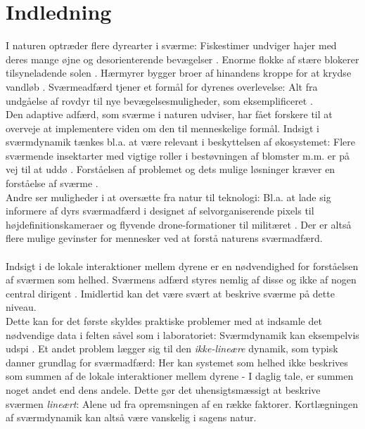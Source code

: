 \chapter{Indledning}\label{ch:introduction}

I naturen optræder flere dyrearter i sværme: Fiskestimer undviger hajer med deres mange øjne og desorienterende bevægelser \cite{fishschooling}. Enorme flokke af stære blokerer tilsyneladende solen \cite{sortsol}. Hærmyrer bygger broer af hinandens kroppe for at krydse vandløb \cite{armyants}. 
Sværmeadfærd tjener et formål for dyrenes overlevelse: Alt fra undgåelse af rovdyr til nye bevægelsesmuligheder, som eksemplificeret \cite{biofoundations}.\\
Den adaptive adfærd, som sværme i naturen udviser, har fået forskere til at overveje at implementere viden om den til menneskelige formål.
Indsigt i sværmdynamik tænkes bl.a. at være relevant i beskyttelsen af økosystemet: Flere sværmende insektarter med vigtige roller i bestøvningen af blomster m.m. er på vej til at uddø  \cite{ripinsects}. Forståelsen af problemet og dets mulige løsninger kræver en forståelse af sværme \cite{swarmdecline}. \\ Andre ser muligheder i at oversætte fra natur til teknologi: Bl.a. at lade sig informere af dyrs sværmadfærd i designet af selvorganiserende pixels til højdefinitionskameraer og flyvende drone-formationer til militæret \cite{camera}\cite{pentagon}.
Der er altså flere mulige gevinster for mennesker ved at forstå naturens sværmadfærd.\\\\
Indsigt i de lokale interaktioner mellem dyrene er en nødvendighed for forståelsen af sværmen som helhed. Sværmens adfærd styres nemlig af disse og ikke af nogen central dirigent \cite{selforganimals}.  
Imidlertid kan det være svært at beskrive sværme på dette niveau.\\ Dette kan for det første skyldes praktiske problemer med at indsamle det nødvendige data i felten såvel som i laboratoriet: Sværmdynamik kan eksempelvis udspi \cite{swarmsaredifficult}. 
Et andet problem lægger sig til den \textit{ikke-lineære} dynamik, som typisk danner grundlag for sværmadfærd: Her kan systemet som helhed ikke beskrives som summen af de lokale interaktioner mellem dyrene - I daglig tale, er summen noget andet end dens andele\cite{nonlinear}\cite{swarmsarenonlinear}. 
Dette gør det uhensigtsmæssigt at beskrive sværmen \textit{lineært}: Alene ud fra opremsningen af en række faktorer. Kortlægningen af sværmdynamik kan altså være vanskelig i sagens natur.
